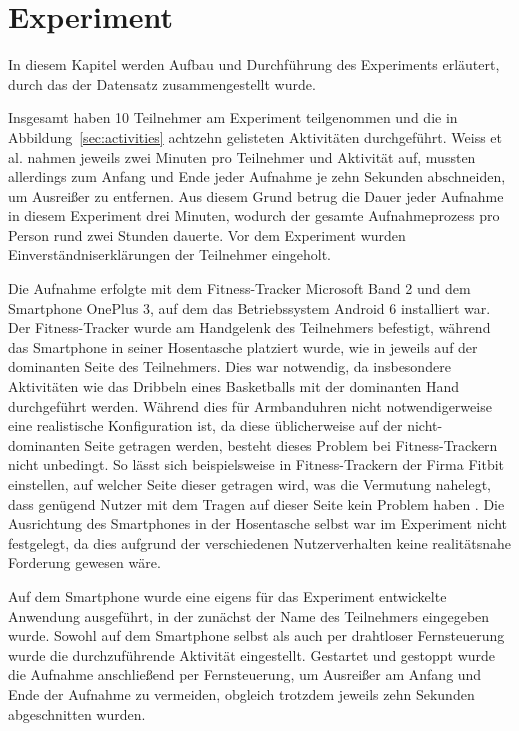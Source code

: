 \chapter{Experiment}
\label{chap:experiment}
In diesem Kapitel werden Aufbau und Durchführung des Experiments erläutert, durch das der Datensatz zusammengestellt wurde.

Insgesamt haben 10 Teilnehmer am Experiment teilgenommen und die in Abbildung~\ref{sec:activities} achtzehn gelisteten Aktivitäten durchgeführt. Weiss et al. nahmen jeweils zwei Minuten pro Teilnehmer und Aktivität auf\cite{Weiss2016}, mussten allerdings zum Anfang und Ende jeder Aufnahme je zehn Sekunden abschneiden, um Ausreißer zu entfernen. Aus diesem Grund betrug die Dauer jeder Aufnahme in diesem Experiment drei Minuten, wodurch der gesamte Aufnahmeprozess pro Person rund zwei Stunden dauerte. Vor dem Experiment wurden Einverständniserklärungen der Teilnehmer eingeholt.

Die Aufnahme erfolgte mit dem Fitness-Tracker Microsoft Band 2 und dem Smartphone OnePlus 3, auf dem das Betriebssystem Android 6 installiert war. Der Fitness-Tracker wurde am Handgelenk des Teilnehmers befestigt, während das Smartphone in seiner Hosentasche platziert wurde, wie in \cite{Weiss2016} jeweils auf der dominanten Seite des Teilnehmers. Dies war notwendig, da insbesondere Aktivitäten wie das Dribbeln eines Basketballs mit der dominanten Hand durchgeführt werden. Während dies für Armbanduhren nicht notwendigerweise eine realistische Konfiguration ist, da diese üblicherweise auf der nicht-dominanten Seite getragen werden, besteht dieses Problem bei Fitness-Trackern nicht unbedingt. So lässt sich beispielsweise in Fitness-Trackern der Firma Fitbit einstellen, auf welcher Seite dieser getragen wird, was die Vermutung nahelegt, dass genügend Nutzer mit dem Tragen auf dieser Seite kein Problem haben \cite{FitbitHelpDominant}. Die Ausrichtung des Smartphones in der Hosentasche selbst war im Experiment nicht festgelegt, da dies aufgrund der verschiedenen Nutzerverhalten keine realitätsnahe Forderung gewesen wäre.

Auf dem Smartphone wurde eine eigens für das Experiment entwickelte Anwendung ausgeführt, in der zunächst der Name des Teilnehmers eingegeben wurde. Sowohl auf dem Smartphone selbst als auch per drahtloser Fernsteuerung wurde die durchzuführende Aktivität eingestellt. Gestartet und gestoppt wurde die Aufnahme anschließend per Fernsteuerung, um Ausreißer am Anfang und Ende der Aufnahme zu vermeiden, obgleich trotzdem jeweils zehn Sekunden abgeschnitten wurden.

